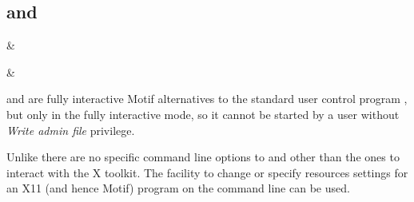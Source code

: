 \subsection{\XbtuserName{} and \XmbtuserName}

\begin{expara}

\XbtuserName{} \&

\XmbtuserName{} \&

\end{expara}

\PrXbtuser{} and \PrXmbtuser{} are fully interactive Motif alternatives to the standard user control program \PrBtuser{}, but
only in the fully interactive mode, so it cannot be started by a user without \textit{Write admin file} privilege.

Unlike \PrBtuser{} there are no specific command line options to \PrXbtuser{} and \PrXmbtuser{} other than the ones
to interact with the X toolkit. The facility to change or specify resources settings for an X11 (and hence Motif) program on the
command line can be used.

